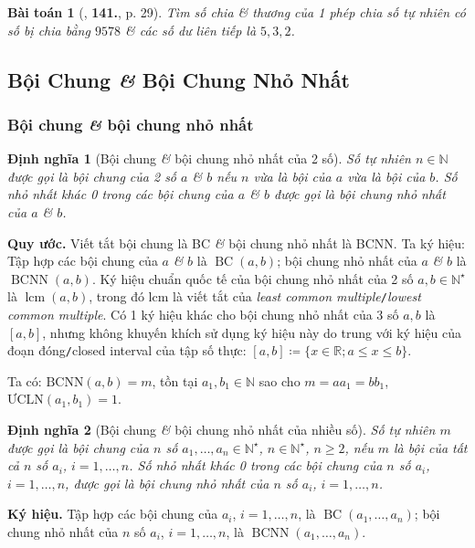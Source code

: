 \documentclass{article}
\numberwithin{equation}{section}
\newtheorem{dinhnghia}{Định nghĩa}[section]
\newtheorem{baitoan}{Bài toán}[section]
\begin{document}
\begin{baitoan}[\cite{Binh_Toan_6_tap_1}, \textbf{141.}, p. 29]
	Tìm số chia \& thương của 1 phép chia số tự nhiên có số bị chia bằng $9578$ \& các số dư liên tiếp là $5,3,2$.
\end{baitoan}


\subsection{Bội Chung \textit{\&} Bội Chung Nhỏ Nhất}

\subsubsection{Bội chung \textit{\&} bội chung nhỏ nhất}

\begin{dinhnghia}[Bội chung \textit{\&} bội chung nhỏ nhất của 2 số]
	Số tự nhiên $n\in\mathbb{N}$ được gọi là \emph{bội chung} của 2 số $a$ \textit{\&} $b$ nếu $n$ vừa là bội của $a$ vừa là bội của $b$. Số nhỏ nhất khác 0 trong các bội chung của $a$ \textit{\&} $b$ được gọi là \emph{bội chung nhỏ nhất} của $a$ \textit{\&} $b$.
\end{dinhnghia}
\noindent\textbf{Quy ước.} Viết tắt bội chung là BC \textit{\&} bội chung nhỏ nhất là BCNN. Ta ký hiệu: Tập hợp các bội chung của $a$ \textit{\&} $b$ là $\operatorname{BC}(a,b)$; bội chung nhỏ nhất của $a$ \textit{\&} $b$ là $\operatorname{BCNN}(a,b)$. Ký hiệu chuẩn quốc tế của bội chung nhỏ nhất của 2 số $a,b\in\mathbb{N}^\star$ là $\operatorname{lcm}(a,b)$, trong đó lcm là viết tắt của \textit{least common multiple}\texttt{/}\textit{lowest common multiple}. Có 1 ký hiệu khác cho bội chung nhỏ nhất của 3 số $a,b$ là $[a,b]$, nhưng không khuyến khích sử dụng ký hiệu này do trung với ký hiệu của đoạn đóng\texttt{/}closed interval của tập số thực: $[a,b]\coloneqq\{x\in\mathbb{R};a\le x\le b\}$.

Ta có: $\mbox{BCNN}(a,b) = m$, tồn tại $a_1,b_1\in\mathbb{N}$ sao cho $m = aa_1 = bb_1$, $\mbox{ƯCLN}(a_1,b_1) = 1$.

\begin{dinhnghia}[Bội chung \textit{\&} bội chung nhỏ nhất của nhiều số]
	Số tự nhiên $m$ được gọi là \emph{bội chung} của $n$ số $a_1,\ldots,a_n\in\mathbb{N}^\star$, $n\in\mathbb{N}^\star$, $n\ge 2$, nếu $m$ là bội của tất cả $n$ số $a_i$, $i = 1,\ldots,n$. Số nhỏ nhất khác 0 trong các bội chung của $n$ số $a_i$, $i = 1,\ldots,n$, được gọi là \emph{bội chung nhỏ nhất} của $n$ số $a_i$, $i = 1,\ldots,n$.
\end{dinhnghia}
\noindent\textbf{Ký hiệu.} Tập hợp các bội chung của $a_i$, $i = 1,\ldots,n$, là $\operatorname{BC}(a_1,\ldots,a_n)$; bội chung nhỏ nhất của $n$ số $a_i$, $i = 1,\ldots,n$, là $\operatorname{BCNN}(a_1,\ldots,a_n)$.
\end{document}
